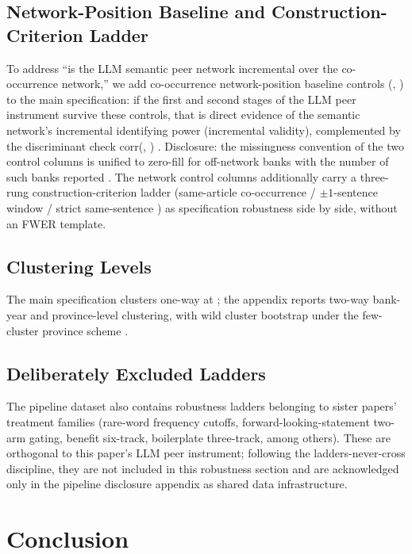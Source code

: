 \subsection{Network-Position Baseline and Construction-Criterion Ladder}
To address ``is the LLM semantic peer network incremental over the co-occurrence network,'' we
add co-occurrence network-position baseline controls (,
) to the main specification: if the first and second stages of
the LLM peer instrument survive these controls, that is direct evidence of the semantic
network's incremental identifying power (incremental validity), complemented by the
discriminant check corr(, )
. Disclosure: the missingness convention of the two control
columns is unified to zero-fill for off-network banks with the number of such banks reported
. The network control columns additionally carry a three-rung
construction-criterion ladder (same-article co-occurrence / $\pm 1$-sentence window
 / strict same-sentence ) as specification robustness side by side,
without an FWER template.

\subsection{Clustering Levels}
The main specification clusters one-way at ; the appendix reports two-way
bank-year and province-level clustering, with wild cluster bootstrap under the few-cluster
province scheme \parencite{mackinnon2023cluster,cameron2015practitioner}.

\subsection{Deliberately Excluded Ladders}
The pipeline dataset also contains robustness ladders belonging to sister papers' treatment
families (rare-word frequency cutoffs, forward-looking-statement two-arm gating, benefit
six-track, boilerplate three-track, among others). These are orthogonal to this paper's LLM
peer instrument; following the ladders-never-cross discipline, they are not included in this
robustness section and are acknowledged only in the pipeline disclosure appendix as shared
data infrastructure.

\section{Conclusion}\label{sec:concl}

